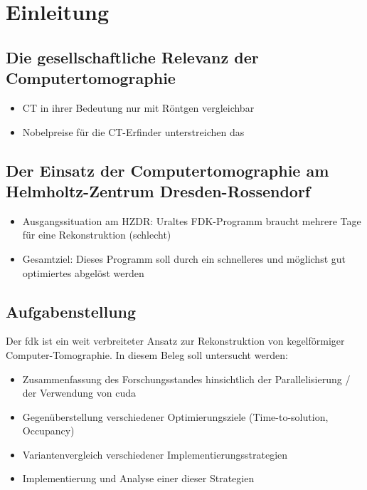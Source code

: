 \chapter{Einleitung}

\section{Die gesellschaftliche Relevanz der Computertomographie}

\begin{itemize}
    \item CT in ihrer Bedeutung nur mit Röntgen vergleichbar
    \item Nobelpreise für die CT-Erfinder unterstreichen das
\end{itemize}

\section{Der Einsatz der Computertomographie am Helmholtz-Zentrum Dresden-Rossendorf}

\begin{itemize}
    \item Ausgangssituation am HZDR: Uraltes FDK-Programm braucht mehrere Tage für eine Rekonstruktion (schlecht)
    \item Gesamtziel: Dieses Programm soll durch ein schnelleres und möglichst gut optimiertes abgelöst werden
\end{itemize}

\section{Aufgabenstellung}

Der \gls{fdk} ist ein weit verbreiteter Ansatz zur Rekonstruktion von kegelförmiger Computer-Tomographie. In diesem
Beleg soll untersucht werden:

\begin{itemize}
    \item Zusammenfassung des Forschungsstandes hinsichtlich der Parallelisierung / der Verwendung von \gls{cuda}
    \item Gegenüberstellung verschiedener Optimierungsziele (Time-to-solution, Occupancy)
    \item Variantenvergleich verschiedener Implementierungsstrategien
    \item Implementierung und Analyse einer dieser Strategien
\end{itemize}
